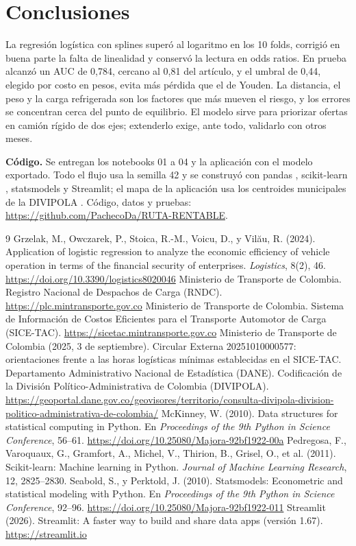 \documentclass[11pt,letterpaper]{article}
\begin{document}
\section{Conclusiones}

La regresión logística con splines superó al logaritmo en los 10 folds, corrigió en buena parte la falta de linealidad y conservó la lectura en odds ratios. En prueba alcanzó un AUC de 0,784, cercano al 0,81 del artículo, y el umbral de 0,44, elegido por costo en pesos, evita más pérdida que el de Youden. La distancia, el peso y la carga refrigerada son los factores que más mueven el riesgo, y los errores se concentran cerca del punto de equilibrio. El modelo sirve para priorizar ofertas en camión rígido de dos ejes; extenderlo exige, ante todo, validarlo con otros meses.

\textbf{Código.} Se entregan los notebooks 01 a 04 y la aplicación con el modelo exportado. Todo el flujo usa la semilla 42 y se construyó con pandas \cite{pandas}, scikit-learn \cite{sklearn}, statsmodels y Streamlit; el mapa de la aplicación usa los centroides municipales de la DIVIPOLA \cite{divipola}. Código, datos y pruebas: \url{https://github.com/PachecoDa/RUTA-RENTABLE}.

\begin{thebibliography}{9}
\small
{} Grzelak, M., Owczarek, P., Stoica, R.-M., Voicu, D., y Vil\u{a}u, R. (2024). Application of logistic regression to analyze the economic efficiency of vehicle operation in terms of the financial security of enterprises. \emph{Logistics}, 8(2), 46. \url{https://doi.org/10.3390/logistics8020046}
 Ministerio de Transporte de Colombia. Registro Nacional de Despachos de Carga (RNDC). \url{https://plc.mintransporte.gov.co}
 Ministerio de Transporte de Colombia. Sistema de Información de Costos Eficientes para el Transporte Automotor de Carga (SICE-TAC). \url{https://sicetac.mintransporte.gov.co}
 Ministerio de Transporte de Colombia (2025, 3 de septiembre). Circular Externa 20251010000577: orientaciones frente a las horas logísticas mínimas establecidas en el SICE-TAC.
 Departamento Administrativo Nacional de Estadística (DANE). Codificación de la División Político-Administrativa de Colombia (DIVIPOLA). \url{https://geoportal.dane.gov.co/geovisores/territorio/consulta-divipola-division-politico-administrativa-de-colombia/}
 McKinney, W. (2010). Data structures for statistical computing in Python. En \emph{Proceedings of the 9th Python in Science Conference}, 56--61. \url{https://doi.org/10.25080/Majora-92bf1922-00a}
 Pedregosa, F., Varoquaux, G., Gramfort, A., Michel, V., Thirion, B., Grisel, O., et al. (2011). Scikit-learn: Machine learning in Python. \emph{Journal of Machine Learning Research}, 12, 2825--2830.
 Seabold, S., y Perktold, J. (2010). Statsmodels: Econometric and statistical modeling with Python. En \emph{Proceedings of the 9th Python in Science Conference}, 92--96. \url{https://doi.org/10.25080/Majora-92bf1922-011}
 Streamlit (2026). Streamlit: A faster way to build and share data apps (versión 1.67). \url{https://streamlit.io}
\end{thebibliography}
\end{document}
